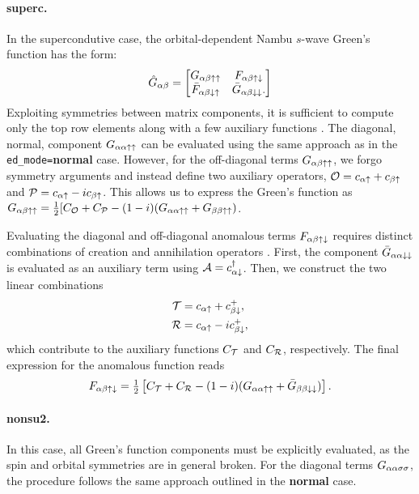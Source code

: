 \documentclass[edipack_sp.tex]{subfiles}
\begin{document}
\paragraph{{\bf superc}.}
In the supercondutive case, the orbital-dependent Nambu $s$-wave
Green's function has the form:
\begin{equation}
  \label{GFnambu}
  \hat{G}_{\alpha\beta} =
  \begin{bmatrix}
    G_{\alpha\beta\uparrow\uparrow} & F_{\alpha\beta\uparrow\downarrow} \\
    \bar{F}_{\alpha\beta\downarrow\uparrow} & \bar{G}_{\alpha\beta\downarrow\downarrow}.
  \end{bmatrix}  
\end{equation}
Exploiting symmetries between matrix components, it is 
sufficient to compute only the top row elements along with 
a few auxiliary functions \cite{Capone2001PRL,Capone2002Science,Capone2004PRLsc,Toschi2005NJP,Toschi2005PRB,Capone2009RMP}.
%
The diagonal, normal, component $G_{\alpha\alpha\uparrow\uparrow}$ can be 
evaluated using the same approach as in the {\tt ed\_mode=}{\bf normal} 
case. However, for the off-diagonal terms $G_{\alpha\beta\uparrow\uparrow}$, 
we forgo symmetry arguments and instead define two 
auxiliary operators, ${\cal O} = c_{\alpha\uparrow} + c_{\beta\uparrow}$ and 
${\cal P} = c_{\alpha\uparrow} - i c_{\beta\uparrow}$. This allows us to express 
the Green's function as
$G_{\alpha\beta\uparrow\uparrow}=\tfrac{1}{2}[C_{\cal O} + C_{\cal P} -
(1-i)(G_{\alpha\alpha\uparrow\uparrow}+G_{\beta\beta\uparrow\uparrow})$.

Evaluating the diagonal and off-diagonal anomalous terms 
$F_{\alpha\beta\uparrow\downarrow}$ requires distinct combinations of 
creation and annihilation operators \cite{Capone2001PRL,Capone2002Science,Capone2004PRLsc,Toschi2005NJP,Toschi2005PRB}. First, the component 
$\bar{G}_{\alpha\alpha\downarrow\downarrow}$ is evaluated as an auxiliary term 
using ${\cal A} = c^\dagger_{\alpha\downarrow}$. Then, we construct the two  
linear combinations
\begin{align*}
{\cal T} &= c_{\alpha\uparrow} + c^+_{\beta\downarrow}, \\
{\cal R} &= c_{\alpha\uparrow} - i c^+_{\beta\downarrow},
\end{align*}
which contribute to the auxiliary functions $C_{\cal T}$ and 
$C_{\cal R}$, respectively. The final expression for the 
anomalous function reads
\begin{equation}
F_{\alpha\beta\uparrow\downarrow} = \tfrac{1}{2} \left[ C_{\cal T} + C_{\cal R} - 
(1-i)(G_{\alpha\alpha\uparrow\uparrow} + \bar{G}_{\beta\beta\downarrow\downarrow}) \right].
\end{equation}



\paragraph{{\bf nonsu2}.}
In this case, all Green's function components 
must be explicitly evaluated, as the spin and orbital 
symmetries are in general broken. For the diagonal terms 
$G_{\alpha\alpha\sigma\sigma}$, the procedure follows the same approach 
outlined in the {\bf normal} case. 
\end{document}
